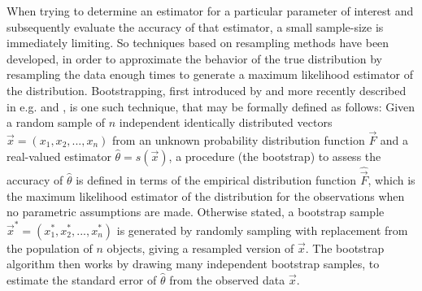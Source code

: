 \documentclass[structabstract]{aa}
\begin{document}
When trying to determine an estimator for a particular parameter of interest and subsequently evaluate the accuracy of that estimator, a small sample-size is immediately limiting. So techniques based on resampling methods have been developed, in order to approximate the behavior of the true distribution by resampling the data enough times to generate a maximum likelihood estimator of the distribution. Bootstrapping, first introduced by \citet{Efron:1979p1831} and more recently described in e.g. \citet{1994.book.Efron} and \citet{Chernick1999}, is one such technique, that may be formally defined as follows: Given a random sample of $n$ independent identically distributed vectors $\vec{x} = \left( x_1, x_2, ..., x_n \right)$ from an unknown probability distribution function $\vec{F}$ and a real-valued estimator $\hat{\theta} = s \left( \vec{x} \right)$, a procedure (the bootstrap) to assess the accuracy of $\hat{\theta}$ is defined in terms of the empirical distribution function $\hat{\vec{F}}$, which is the maximum likelihood estimator of the distribution for the observations when no parametric assumptions are made. Otherwise stated, a bootstrap sample $\vec{x}^* = \left( x_1^*, x_2^*, ..., x_n^* \right)$ is generated by randomly sampling with replacement from the population of $n$ objects, giving a resampled version of $\vec{x}$. The bootstrap algorithm then works by drawing many independent bootstrap samples, to estimate the standard error of $\hat{\theta}$ from the observed data $\vec{x}$.
\end{document}
